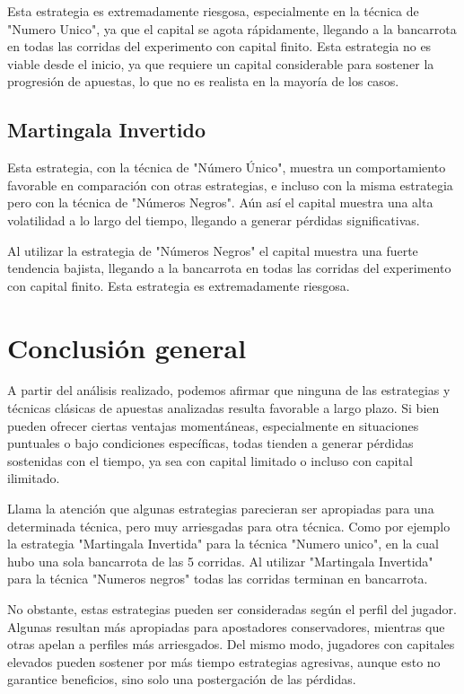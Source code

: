 \documentclass{article}
\begin{document}
Esta estrategia es extremadamente riesgosa, especialmente en la técnica de "Numero Unico", ya que el capital se agota rápidamente, llegando a la bancarrota en todas las corridas del experimento con capital finito. Esta estrategia no es viable desde el inicio, ya que requiere un capital considerable para sostener la progresión de apuestas, lo que no es realista en la mayoría de los casos.


\subsection{Martingala Invertido}
Esta estrategia, con la técnica de "Número Único", muestra un comportamiento favorable en comparación con otras estrategias, e incluso con la misma estrategia pero con la técnica de "Números Negros". Aún así el capital muestra una alta volatilidad a lo largo del tiempo, llegando a generar pérdidas significativas.

Al utilizar la estrategia de "Números Negros" el capital muestra una fuerte tendencia bajista, llegando a la bancarrota en todas las corridas del experimento con capital finito. Esta estrategia es extremadamente riesgosa.





\section{Conclusión general}
A partir del análisis realizado, podemos afirmar que ninguna de las estrategias y técnicas clásicas de apuestas analizadas resulta favorable a largo plazo. Si bien pueden ofrecer ciertas ventajas momentáneas, especialmente en situaciones puntuales o bajo condiciones específicas, todas tienden a generar pérdidas sostenidas con el tiempo, ya sea con capital limitado o incluso con capital ilimitado.

Llama la atención que algunas estrategias parecieran ser apropiadas para una determinada técnica, pero muy arriesgadas para otra técnica. Como por ejemplo la estrategia "Martingala Invertida" para la técnica "Numero unico", en la cual hubo una sola bancarrota de las 5 corridas. Al utilizar "Martingala Invertida" para la técnica "Numeros negros" todas las corridas terminan en bancarrota.


No obstante, estas estrategias pueden ser consideradas según el perfil del jugador. Algunas resultan más apropiadas para apostadores conservadores, mientras que otras apelan a perfiles más arriesgados. Del mismo modo, jugadores con capitales elevados pueden sostener por más tiempo estrategias agresivas, aunque esto no garantice beneficios, sino solo una postergación de las pérdidas.
\end{document}
